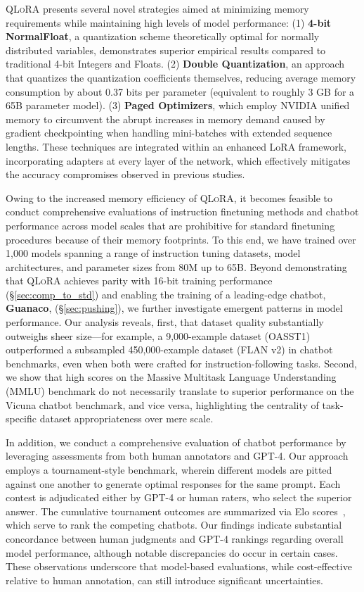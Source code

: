 \textsc{QLoRA} presents several novel strategies aimed at minimizing memory requirements while maintaining high levels of model performance: (1) \textbf{4-bit NormalFloat}, a quantization scheme theoretically optimal for normally distributed variables, demonstrates superior empirical results compared to traditional 4-bit Integers and Floats. (2) \textbf{Double Quantization}, an approach that quantizes the quantization coefficients themselves, reducing average memory consumption by about 0.37 bits per parameter (equivalent to roughly 3 GB for a 65B parameter model). (3) \textbf{Paged Optimizers}, which employ NVIDIA unified memory to circumvent the abrupt increases in memory demand caused by gradient checkpointing when handling mini-batches with extended sequence lengths. These techniques are integrated within an enhanced LoRA framework, incorporating adapters at every layer of the network, which effectively mitigates the accuracy compromises observed in previous studies.

Owing to the increased memory efficiency of \textsc{QLoRA}, it becomes feasible to conduct comprehensive evaluations of instruction finetuning methods and chatbot performance across model scales that are prohibitive for standard finetuning procedures because of their memory footprints. To this end, we have trained over 1,000 models spanning a range of instruction tuning datasets, model architectures, and parameter sizes from 80M up to 65B. Beyond demonstrating that \textsc{QLoRA} achieves parity with 16-bit training performance (\S\ref{sec:comp_to_std}) and enabling the training of a leading-edge chatbot, \textbf{Guanaco}, (\S\ref{sec:pushing}), we further investigate emergent patterns in model performance. Our analysis reveals, first, that dataset quality substantially outweighs sheer size—for example, a 9,000-example dataset (OASST1) outperformed a subsampled 450,000-example dataset (FLAN v2) in chatbot benchmarks, even when both were crafted for instruction-following tasks. Second, we show that high scores on the Massive Multitask Language Understanding (MMLU) benchmark do not necessarily translate to superior performance on the Vicuna chatbot benchmark, and vice versa, highlighting the centrality of task-specific dataset appropriateness over mere scale.

In addition, we conduct a comprehensive evaluation of chatbot performance by leveraging assessments from both human annotators and GPT-4. Our approach employs a tournament-style benchmark, wherein different models are pitted against one another to generate optimal responses for the same prompt. Each contest is adjudicated either by GPT-4 or human raters, who select the superior answer. The cumulative tournament outcomes are summarized via Elo scores~\citep{elo1967proposed, elo1978rating}, which serve to rank the competing chatbots. Our findings indicate substantial concordance between human judgments and GPT-4 rankings regarding overall model performance, although notable discrepancies do occur in certain cases. These observations underscore that model-based evaluations, while cost-effective relative to human annotation, can still introduce significant uncertainties.


